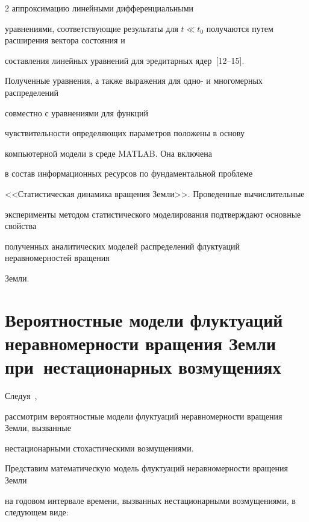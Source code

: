 \begin{multicols}{2}
аппроксимацию линейными дифференциальными


уравнениями, соответствующие результаты для $t\ll t_0$ получаются путем расширения вектора состояния и


составления линейных уравнений для эредитарных ядер~[12--15].





\smallskip





Полученные уравнения, а также выражения для одно- и многомерных распределений


совместно с уравнениями для  функций


чувствительности определяющих параметров положены в основу


компьютерной модели в среде MATLAB. Она  включена\linebreak


в состав информационных ресурсов по фундаментальной проблеме


<<Статистическая динамика вращения Земли>>. Проведенные вычислительные\linebreak


 эксперименты методом статистического моделирования подтверждают основные свойства 


 полученных аналитических моделей  распределений флуктуаций неравномерностей вращения 


 Земли.





\section{Вероятностные модели флуктуаций неравномерности вращения Земли при~нестационарных возмущениях}





Следуя~\cite{15-mar, 16-mar},


рассмотрим вероятностные модели флуктуаций неравномерности вращения Земли, вызванные 


нестационарными стохастическими возмущениями.





Представим математическую модель флуктуаций неравномерности вращения Земли 


на годовом интервале времени, вызванных нестационарными возмущениями, в следующем виде:



\end{multicols}
